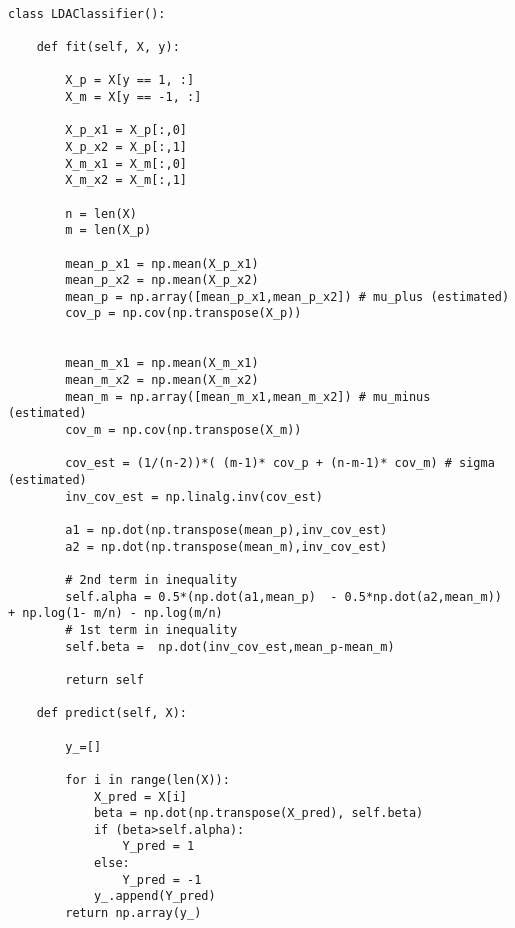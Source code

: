 \lstset{language=Python}
\lstset{frame=lines}
\lstset{basicstyle=\footnotesize}
\begin{lstlisting}

class LDAClassifier():
    
    def fit(self, X, y):       
        
        X_p = X[y == 1, :]
        X_m = X[y == -1, :]
        
        X_p_x1 = X_p[:,0]
        X_p_x2 = X_p[:,1]
        X_m_x1 = X_m[:,0]
        X_m_x2 = X_m[:,1]
        
        n = len(X)
        m = len(X_p)
        
        mean_p_x1 = np.mean(X_p_x1)
        mean_p_x2 = np.mean(X_p_x2)
        mean_p = np.array([mean_p_x1,mean_p_x2]) # mu_plus (estimated)
        cov_p = np.cov(np.transpose(X_p))
        

        mean_m_x1 = np.mean(X_m_x1)
        mean_m_x2 = np.mean(X_m_x2)
        mean_m = np.array([mean_m_x1,mean_m_x2]) # mu_minus (estimated)
        cov_m = np.cov(np.transpose(X_m))
        
        cov_est = (1/(n-2))*( (m-1)* cov_p + (n-m-1)* cov_m) # sigma (estimated)
        inv_cov_est = np.linalg.inv(cov_est)
        
        a1 = np.dot(np.transpose(mean_p),inv_cov_est)
        a2 = np.dot(np.transpose(mean_m),inv_cov_est)
        
        # 2nd term in inequality
        self.alpha = 0.5*(np.dot(a1,mean_p)  - 0.5*np.dot(a2,mean_m)) + np.log(1- m/n) - np.log(m/n)
        # 1st term in inequality
        self.beta =  np.dot(inv_cov_est,mean_p-mean_m)
        
        return self
    
    def predict(self, X):
        
        y_=[]
        
        for i in range(len(X)):
            X_pred = X[i]
            beta = np.dot(np.transpose(X_pred), self.beta)
            if (beta>self.alpha):
                Y_pred = 1
            else:
                Y_pred = -1
            y_.append(Y_pred)
        return np.array(y_) 

\end{lstlisting}

\vspace{5mm}